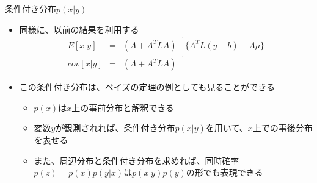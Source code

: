 \begin{frame}{条件付き分布$p(x|y)$}
 \begin{itemize}
  \item 同様に、以前の結果を利用する
        \begin{eqnarray}
         E[x|y]& =& (\Lambda+A^TLA)^{-1}\{A^TL(y-b)+\Lambda\mu\}\\
         cov[x|y] &= & (\Lambda+A^TLA)^{-1}
        \end{eqnarray}
  \item この条件付き分布は、ベイズの定理の例としても見ることができる
        \begin{itemize}
         \item $p(x)$は$x$上の事前分布と解釈できる
         \item 変数$y$が観測されれば、条件付き分布$p(x|y)$を用いて、$x$上での事後分布を表せる
         \item また、周辺分布と条件付き分布を求めれば、同時確率$p(z)=p(x)p(y|x)$は$p(x|y)p(y)$の形でも表現できる
        \end{itemize}
 \end{itemize}

\end{frame}
